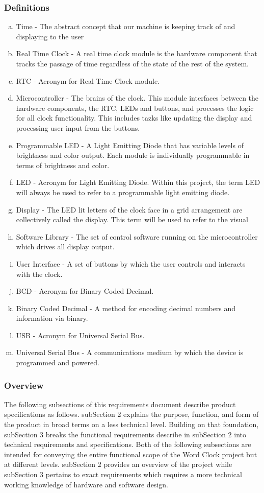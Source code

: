 \documentclass[onecolumn, draftclsnofoot,10pt, compsoc]{IEEEtran}
\begin{document}
\subsubsection{Definitions}
\begin{enumerate}[a)]
  \item Time - The abstract concept that our machine is keeping track of and displaying to the user
  \item Real Time Clock - A real time clock module is the hardware component that tracks the passage
  of time regardless of the state of the rest of the system.
  \item RTC - Acronym for Real Time Clock module.
  \item Microcontroller - The brains of the clock. This module interfaces between the hardware
  components, the RTC, LEDs and buttons, and processes the logic for all clock functionality.
  This includes tazks like updating the display and processing user input from the buttons.
  \item Programmable LED - A Light Emitting Diode that has variable levels of brightness and
  color output. Each module is individually programmable in terms of brightness and color.
  \item LED - Acronym for Light Emitting Diode. Within this project, the term LED will always
  be used to refer to a programmable light emitting diode.
  \item Display - The LED lit letters of the clock face in a grid arrangement are collectively
  called the display. This term will be used to refer to the visual
  \item Software Library - The set of control software running on the microcontroller which drives all display output.
  \item User Interface - A set of buttons by which the user controls and interacts with the clock.
  \item BCD - Acronym for Binary Coded Decimal.
  \item Binary Coded Decimal - A method for encoding decimal numbers and information via binary.
  \item USB - Acronym for Universal Serial Bus.
  \item Universal Serial Bus - A communications medium by which the device is programmed and  powered.
\end{enumerate}

\subsubsection{Overview}
The following subsections of this requirements document describe product specifications as follows.
subSection 2 explains the purpose, function, and form of the product in broad terms on a less
technical level. Building on that foundation, subSection 3 breaks the functional requirements
describe in subSection 2 into technical requirements and specifications.
    Both of the following subsections are intended for conveying the entire functional
scope of the Word Clock project but at different levels. subSection 2 provides an overview of the
project while subSection 3 pertains to exact requirements which requires a more technical working
knowledge of hardware and software design.
\end{document}
